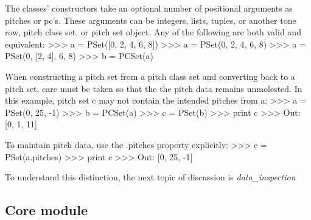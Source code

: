 \documentclass[letterpaper,10pt,english]{sphinxmanual}
\begin{document}
The classes' constructors take an optional number of positional arguments as pitches or pc's.
These arguments can be integers, lists, tuples, or another tone row, pitch class set, or pitch set object.
Any of the following are both valid and equivalent:
\textgreater{}\textgreater{}\textgreater{} a = PSet({[}0, 2, 4, 6, 8{]})
\textgreater{}\textgreater{}\textgreater{} a = PSet(0, 2, 4, 6, 8)
\textgreater{}\textgreater{}\textgreater{} a = PSet(0, {[}2, 4{]}, 6, 8)
\textgreater{}\textgreater{}\textgreater{} b = PCSet(a)

When constructing a pitch set from a pitch class set and converting back to a pitch set, care must be taken so that the the pitch data remains unmolested.
In this example, pitch set c may not contain the intended pitches from a:
\textgreater{}\textgreater{}\textgreater{} a = PSet(0, 25, -1)
\textgreater{}\textgreater{}\textgreater{} b = PCSet(a)
\textgreater{}\textgreater{}\textgreater{} c = PSet(b)
\textgreater{}\textgreater{}\textgreater{} print c
\textgreater{}\textgreater{}\textgreater{} Out: {[}0, 1, 11{]}

To maintain pitch data, use the .pitches property explicitly:
\textgreater{}\textgreater{}\textgreater{} c = PSet(a.pitches)
\textgreater{}\textgreater{}\textgreater{} print c
\textgreater{}\textgreater{}\textgreater{} Out: {[}0, 25, -1{]}

To understand this distinction, the next topic of discussion is \emph{data\_inspection}


\subsection{Core module}
\label{_templates/core::doc}\label{_templates/core:core-module}\label{_templates/core:module-core}
\end{document}
